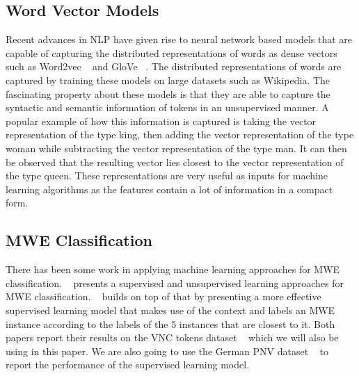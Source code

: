\documentclass[11pt]{article}
\begin{document}
\subsection{Word Vector Models}
Recent advances in NLP have given rise to neural network based models that are capable of capturing the distributed representations of  words as dense vectors such as Word2vec ~\cite{mikolov2013distributed} and GloVe ~\cite{pennington2014glove}. The distributed representations of words are captured by training these models on large datasets such as Wikipedia. The fascinating property about these models is that they are able to capture the syntactic and semantic information of tokens in an unsupervised manner. A popular example of how this information is captured is taking the vector representation of the type king, then adding the vector representation of the type woman while subtracting the vector representation of the type man. It can then be observed that the resulting vector lies closest to the vector representation of the type queen.  These representations are very useful as inputs for machine learning algorithms as the features contain a lot of information in a compact form.

\subsection{MWE Classification}






There has been some work in applying machine learning approaches for MWE classification. ~\cite{cook2007pulling} presents a supervised and unsupervised learning approaches for MWE classification. ~\cite{fazly2009unsupervised} builds on top of that by presenting a more effective supervised learning model that makes use of the context and labels an MWE instance according to the labels of the 5 instances that are closest to it. Both papers report their results on the VNC tokens dataset ~\cite{cook2008vnc} which we will also be using in this paper. We are also going to use the German PNV dataset ~\cite{fritzinger2010survey} to report the performance of the supervised learning model. 
\end{document}
